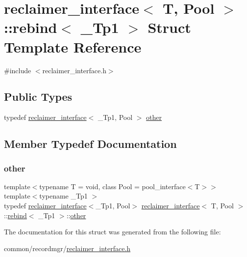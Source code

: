 \hypertarget{structreclaimer__interface_1_1rebind}{}\section{reclaimer\+\_\+interface$<$ T, Pool $>$\+:\+:rebind$<$ \+\_\+\+Tp1 $>$ Struct Template Reference}
\label{structreclaimer__interface_1_1rebind}


{\ttfamily \#include $<$reclaimer\+\_\+interface.\+h$>$}

\subsection*{Public Types}
\begin{DoxyCompactItemize}
\item 
typedef \hyperlink{classreclaimer__interface}{reclaimer\+\_\+interface}$<$ \+\_\+\+Tp1, Pool $>$ \hyperlink{structreclaimer__interface_1_1rebind_a5d532b73197803b0a09b8305c58e8218}{other}
\end{DoxyCompactItemize}


\subsection{Member Typedef Documentation}
\mbox{\label{structreclaimer__interface_1_1rebind_a5d532b73197803b0a09b8305c58e8218}} 
\subsubsection{\texorpdfstring{other}{other}}
{\footnotesize\ttfamily template$<$typename T  = void, class Pool  = pool\+\_\+interface$<$\+T$>$$>$ \\
template$<$typename \+\_\+\+Tp1 $>$ \\
typedef \hyperlink{classreclaimer__interface}{reclaimer\+\_\+interface}$<$\+\_\+\+Tp1, Pool$>$ \hyperlink{classreclaimer__interface}{reclaimer\+\_\+interface}$<$ T, Pool $>$\+::\hyperlink{structreclaimer__interface_1_1rebind}{rebind}$<$ \+\_\+\+Tp1 $>$\+::\hyperlink{structreclaimer__interface_1_1rebind_a5d532b73197803b0a09b8305c58e8218}{other}}



The documentation for this struct was generated from the following file\+:\begin{DoxyCompactItemize}
\item 
common/recordmgr/\hyperlink{reclaimer__interface_8h}{reclaimer\+\_\+interface.\+h}\end{DoxyCompactItemize}
